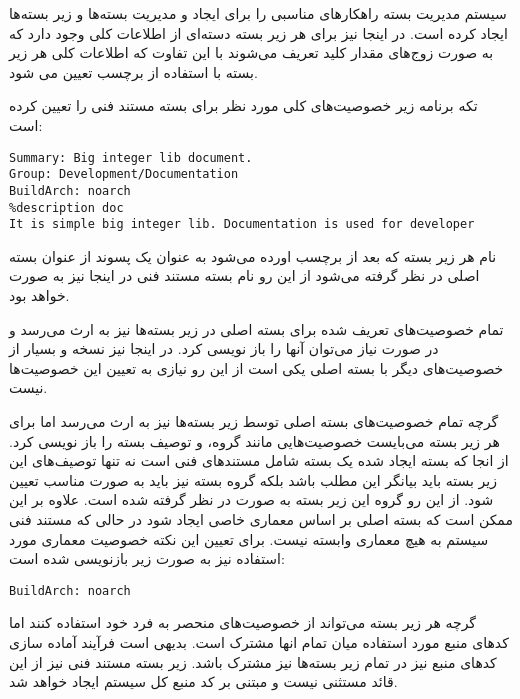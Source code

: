 سیستم مدیریت بسته  راهکارهای مناسبی را برای ایجاد و مدیریت بسته‌ها و زیر
بسته‌ها ایجاد کرده است. در اینجا نیز برای هر زیر بسته دسته‌ای از اطلاعات کلی
وجود دارد که به صورت زوج‌های مقدار کلید تعریف می‌شوند با این تفاوت که اطلاعات
کلی هر زیر بسته با استفاده از برچسب  تعیین می شود.

تکه برنامه زیر خصوصیت‌های کلی مورد نظر برای بسته مستند فنی را تعیین کرده است:

\begin{latin}
\lstset{language=TeX}  
\begin{lstlisting}[frame=single] 
%package doc
Summary: Big integer lib document.
Group: Development/Documentation
BuildArch: noarch
%description doc
It is simple big integer lib. Documentation is used for developer
\end{lstlisting}
\end{latin}

نام هر زیر بسته که بعد از برچسب  اورده می‌شود به عنوان یک پسوند از
عنوان بسته اصلی در نظر گرفته می‌شود از این رو نام بسته مستند فنی در اینجا نیز
به صورت  خواهد بود.

تمام خصوصیت‌های تعریف شده برای بسته اصلی در زیر بسته‌ها نیز به ارث می‌رسد و در
صورت نیاز می‌توان آنها را باز نویسی کرد. در اینجا نیز نسخه و بسیار از خصوصیت‌های
دیگر با بسته اصلی یکی است از این رو نیازی به تعیین این خصوصیت‌ها نیست. 

گرچه تمام خصوصیت‌های بسته اصلی توسط زیر بسته‌ها نیز به ارث می‌رسد اما برای هر
زیر بسته می‌بایست خصوصیت‌هایی مانند گروه، و توصیف بسته را باز نویسی کرد. از انجا
که بسته ایجاد شده یک بسته شامل مستندهای فنی است نه تنها توصیف‌های این زیر بسته
باید بیانگر این مطلب باشد بلکه گروه بسته نیز باید به صورت مناسب تعیین شود. از
این رو گروه این زیر بسته به صورت  در نظر گرفته شده
است. علاوه بر این ممکن است که بسته اصلی بر اساس معماری خاصی ایجاد شود در حالی که
مستند فنی سیستم به هیچ معماری وابسته نیست. برای تعیین این نکته خصوصیت معماری
مورد استفاده نیز به صورت زیر بازنویسی شده است:

\begin{latin}
\lstset{language=TeX}  
\begin{lstlisting}
BuildArch: noarch
\end{lstlisting}
\end{latin}

گرچه هر زیر بسته می‌تواند از خصوصیت‌های منحصر به فرد خود استفاده کنند اما کدهای
منبع مورد استفاده میان تمام انها مشترک است. بدیهی است  فرآیند آماده سازی کدهای
منبع نیز در تمام زیر بسته‌ها نیز مشترک باشد. زیر بسته مستند فنی نیز از این قائد
مستثنی نیست و مبتنی بر کد منبع کل سیستم ایجاد خواهد شد.

